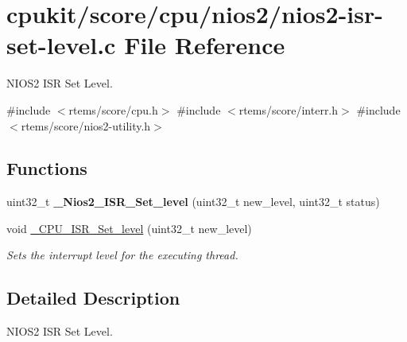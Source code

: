 \hypertarget{nios2-isr-set-level_8c}{}\section{cpukit/score/cpu/nios2/nios2-\/isr-\/set-\/level.c File Reference}
\label{nios2-isr-set-level_8c}


N\+I\+O\+S2 I\+SR Set Level.  


{\ttfamily \#include $<$rtems/score/cpu.\+h$>$}\newline
{\ttfamily \#include $<$rtems/score/interr.\+h$>$}\newline
{\ttfamily \#include $<$rtems/score/nios2-\/utility.\+h$>$}\newline
\subsection*{Functions}
\begin{DoxyCompactItemize}
\item 
\mbox{\label{nios2-isr-set-level_8c_a5bca2b7fe67ef8cb4484449da5fa70ab}} 
uint32\+\_\+t {\bfseries \+\_\+\+Nios2\+\_\+\+I\+S\+R\+\_\+\+Set\+\_\+level} (uint32\+\_\+t new\+\_\+level, uint32\+\_\+t status)
\item 
void \mbox{\hyperlink{group__RTEMSScoreCPUARM_ga43820ba3d51d7a699c22fce8cac93ef1}{\+\_\+\+C\+P\+U\+\_\+\+I\+S\+R\+\_\+\+Set\+\_\+level}} (uint32\+\_\+t new\+\_\+level)
\begin{DoxyCompactList}\small\item\em Sets the interrupt level for the executing thread. \end{DoxyCompactList}\end{DoxyCompactItemize}


\subsection{Detailed Description}
N\+I\+O\+S2 I\+SR Set Level. 


